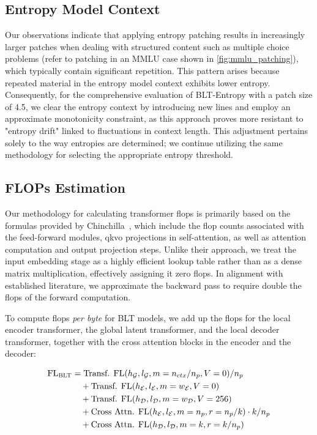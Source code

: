 \subsection{Entropy Model Context}
\label{section:entropy-context}
Our observations indicate that applying entropy patching results in increasingly larger patches when dealing with structured content such as multiple choice problems (refer to patching in an MMLU case shown in \autoref{fig:mmlu_patching}), which typically contain significant repetition. This pattern arises because repeated material in the entropy model context exhibits lower entropy. Consequently, for the comprehensive evaluation of {\textsc BLT}-Entropy with a patch size of 4.5, we clear the entropy context by introducing new lines and employ an approximate monotonicity constraint, as this approach proves more resistant to "entropy drift" linked to fluctuations in context length. This adjustment pertains solely to the way entropies are determined; we continue utilizing the same methodology for selecting the appropriate entropy threshold.

\subsection{FLOPs Estimation} 
\label{section:flops}

Our methodology for calculating transformer flops is primarily based on the formulas provided by Chinchilla~\citep{hoffmann2022training}, which include the flop counts associated with the feed-forward modules, qkvo projections in self-attention, as well as attention computation and output projection steps. Unlike their approach, we treat the input embedding stage as a highly efficient lookup table rather than as a dense matrix multiplication, effectively assigning it zero flops. In alignment with established literature, we approximate the backward pass to require double the flops of the forward computation.

To compute flops \textit{per byte} for {\textsc BLT} models, we add up the flops for the local encoder transformer, the global latent transformer, and the local decoder transformer, together with the cross attention blocks in the encoder and the decoder:

\begin{align}
    \text{FL}_{\text{{\textsc BLT}}} &= \text{Transf. FL}(h_{\mathcal{G}}, l_{\mathcal{G}}, m=n_{ctx}/n_p, V=0) / n_p\\
   &\quad +\text{Transf. FL}(h_{\mathcal{E}}, l_{\mathcal{E}}, m=w_{\mathcal{E}}, V=0) \\
   &\quad + \text{Transf. FL}(h_{\mathcal{D}}, l_{\mathcal{D}}, m=w_{\mathcal{D}}, V=256) \\ 
    &\quad + \text{Cross Attn. FL}(h_{\mathcal{E}}, l_{\mathcal{E}}, m=n_p, r=n_p/k) \cdot k/n_p \\ 
   &\quad + \text{Cross Attn. FL}(h_{\mathcal{D}}, l_{\mathcal{D}}, m=k, r=k/n_p) 
\end{align}


